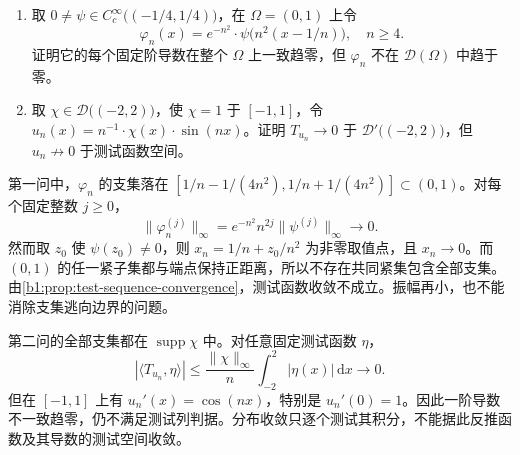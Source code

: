 \begin{exercise}\label{b1:ex:20-test-convergence-boundaries}
\begin{enumerate}
\item\label{b1:item:20-escaping-flat-amplitude}
取 \(0\ne\psi\in C_c^\infty\bigl((-1/4,1/4)\bigr)\)，在 \(\Omega=(0,1)\) 上令
\[
 \varphi_n(x)=e^{-n^2}\cdot \psi\bigl(n^2(x-1/n)\bigr),
 \quad n\ge4.
\]
证明它的每个固定阶导数在整个 \(\Omega\) 上一致趋零，但 \(\varphi_n\) 不在 \(\mathcal D(\Omega)\) 中趋于零。
\item\label{b1:item:20-oscillatory-regular-distributions}
取 \(\chi\in\mathcal D\bigl((-2,2)\bigr)\)，使 \(\chi=1\) 于 \([-1,1]\)，令 \(u_n(x)=n^{-1}\cdot \chi(x)\cdot \sin(nx)\)。证明 \(T_{u_n}\to0\) 于 \(\mathcal D'\bigl((-2,2)\bigr)\)，但 \(u_n\not\to0\) 于测试函数空间。
\end{enumerate}
\end{exercise}
\begin{solution}
第一问中，\(\varphi_n\) 的支集落在 \([1/n-1/(4n^2),1/n+1/(4n^2)]\subset(0,1)\)。对每个固定整数 \(j\ge0\)，
\[
 \|\varphi_n^{(j)}\|_\infty
 =e^{-n^2}n^{2j}\|\psi^{(j)}\|_\infty\longrightarrow0.
\]
然而取 \(z_0\) 使 \(\psi(z_0)\ne0\)，则 \(x_n=1/n+z_0/n^2\) 为非零取值点，且 \(x_n\to0\)。而 \((0,1)\) 的任一紧子集都与端点保持正距离，所以不存在共同紧集包含全部支集。由\cref{b1:prop:test-sequence-convergence}，测试函数收敛不成立。振幅再小，也不能消除支集逃向边界的问题。

第二问的全部支集都在 \(\operatorname{supp}\chi\) 中。对任意固定测试函数 \(\eta\)，
\[
 |\langle T_{u_n},\eta\rangle|
 \le\frac{\|\chi\|_\infty}{n}\int_{-2}^2|\eta(x)|\,\mathrm dx\longrightarrow0.
\]
但在 \([-1,1]\) 上有 \(u_n'(x)=\cos(nx)\)，特别是 \(u_n'(0)=1\)。因此一阶导数不一致趋零，仍不满足测试列判据。分布收敛只逐个测试其积分，不能据此反推函数及其导数的测试空间收敛。
\end{solution}

